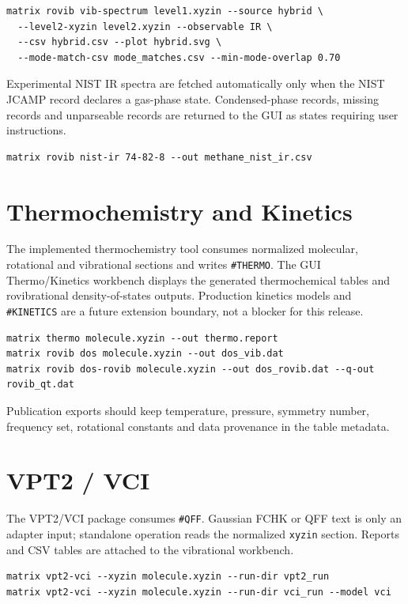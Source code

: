 \documentclass[11pt]{article}
\newcommand{\xyzin}{\texttt{xyzin}}
\newcommand{\sectionname}[1]{\texttt{\##1}}
\begin{document}
\begin{lstlisting}[style=matrix]
matrix rovib vib-spectrum level1.xyzin --source hybrid \
  --level2-xyzin level2.xyzin --observable IR \
  --csv hybrid.csv --plot hybrid.svg \
  --mode-match-csv mode_matches.csv --min-mode-overlap 0.70
\end{lstlisting}

Experimental NIST IR spectra are fetched automatically only when the NIST
JCAMP record declares a gas-phase state.  Condensed-phase records, missing
records and unparseable records are returned to the GUI as states requiring
user instructions.

\begin{lstlisting}[style=matrix]
matrix rovib nist-ir 74-82-8 --out methane_nist_ir.csv
\end{lstlisting}

\section{Thermochemistry and Kinetics}

The implemented thermochemistry tool consumes normalized molecular, rotational
and vibrational sections and writes \sectionname{THERMO}.  The GUI
Thermo/Kinetics workbench displays the generated thermochemical tables and
rovibrational density-of-states outputs.  Production kinetics models and
\sectionname{KINETICS} are a future extension boundary, not a blocker for this
release.

\begin{lstlisting}[style=matrix]
matrix thermo molecule.xyzin --out thermo.report
matrix rovib dos molecule.xyzin --out dos_vib.dat
matrix rovib dos-rovib molecule.xyzin --out dos_rovib.dat --q-out rovib_qt.dat
\end{lstlisting}

Publication exports should keep temperature, pressure, symmetry number,
frequency set, rotational constants and data provenance in the table metadata.

\section{VPT2 / VCI}

The VPT2/VCI package consumes \sectionname{QFF}.  Gaussian FCHK or QFF text is
only an adapter input; standalone operation reads the normalized \xyzin{}
section.  Reports and CSV tables are attached to the vibrational workbench.

\begin{lstlisting}[style=matrix]
matrix vpt2-vci --xyzin molecule.xyzin --run-dir vpt2_run
matrix vpt2-vci --xyzin molecule.xyzin --run-dir vci_run --model vci
\end{lstlisting}
\end{document}
